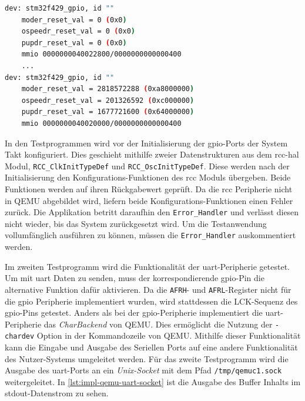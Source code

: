 \begin{minipage}{\linewidth}
\begin{lstlisting}[language=sh,numbers=none,
                label={lst:impl-qemu-gpio-tree},
                caption=QEMU Monitor Ausgabe der QOM Baumstruktur]
dev: stm32f429_gpio, id ""
    moder_reset_val = 0 (0x0)
    ospeedr_reset_val = 0 (0x0)
    pupdr_reset_val = 0 (0x0)
    mmio 0000000040022800/0000000000000400
    ...
dev: stm32f429_gpio, id ""
    moder_reset_val = 2818572288 (0xa8000000)
    ospeedr_reset_val = 201326592 (0xc000000)
    pupdr_reset_val = 1677721600 (0x64000000)
    mmio 0000000040020000/0000000000000400
\end{lstlisting}
\end{minipage}

In den Testprogrammen wird vor der Initialisierung der \ac{gpio}-Ports der
System Takt konfiguriert.
Dies geschieht mithilfe zweier Datenstrukturen aus dem \ac{rcc}-\ac{hal}
Modul, \texttt{RCC\_ClkInitTypeDef} und \texttt{RCC\_OscInitTypeDef}.
Diese werden nach der Initialisierung den Konfigurations-Funktionen des
\ac{rcc} Moduls übergeben.
Beide Funktionen werden auf ihren Rückgabewert geprüft.
Da die \ac{rcc} Peripherie nicht in QEMU abgebildet wird, liefern beide
Konfigurations-Funktionen einen Fehler zurück.
Die Applikation betritt daraufhin den \texttt{Error\_Handler} und verlässt
diesen nicht wieder, bis das System zurückgesetzt wird.
Um die Testanwendung vollumfänglich ausführen zu können, müssen die
\texttt{Error\_Handler} auskommentiert werden.

Im zweiten Testprogramm wird die Funktionalität der \ac{uart}-Peripherie
getestet.
Um mit \ac{uart} Daten zu senden, muss der korrespondierende \ac{gpio}-Pin die
alternative Funktion dafür aktivieren.
Da die \texttt{AFRH}- und \texttt{AFRL}-Register  nicht für die \ac{gpio}
Peripherie implementiert wurden, wird stattdessen die LCK-Sequenz des
\ac{gpio}-Pins getestet.
\newline
Anders als bei der \ac{gpio}-Peripherie implementiert die \ac{uart}-Peripherie
das \textit{CharBackend} von QEMU.
Dies ermöglicht die Nutzung der \texttt{-chardev} Option in der Kommandozeile
von QEMU.
Mithilfe dieser Funktionalität kann die Eingabe und Ausgabe des Seriellen Ports
auf eine andere Funktionalität des Nutzer-Systems umgeleitet werden.
Für das zweite Testprogramm wird die Ausgabe des \ac{uart}-Ports an ein
\textit{Unix-Socket} mit dem Pfad \texttt{/tmp/qemuc1.sock} weitergeleitet.
In \ref{lst:impl-qemu-uart-socket} ist die Ausgabe des Buffer Inhalts im
stdout-Datenstrom zu sehen. 

